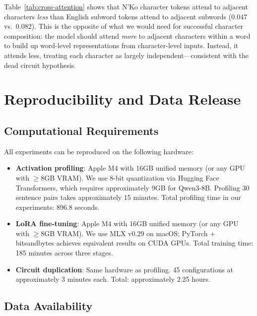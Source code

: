 \documentclass[11pt]{article}
\begin{document}
Table~\ref{tab:cross-attention} shows that N'Ko character tokens attend to adjacent characters \emph{less} than English subword tokens attend to adjacent subwords (0.047 vs.\ 0.082).
This is the opposite of what we would need for successful character composition: the model should attend \emph{more} to adjacent characters within a word to build up word-level representations from character-level inputs.
Instead, it attends less, treating each character as largely independent---consistent with the dead circuit hypothesis.

\section{Reproducibility and Data Release}

\subsection{Computational Requirements}

All experiments can be reproduced on the following hardware:
\begin{itemize}
\item \textbf{Activation profiling}: Apple M4 with 16GB unified memory (or any GPU with $\geq$8GB VRAM). We use 8-bit quantization via Hugging Face Transformers, which requires approximately 9GB for Qwen3-8B. Profiling 30 sentence pairs takes approximately 15 minutes. Total profiling time in our experiments: 896.8 seconds.
\item \textbf{LoRA fine-tuning}: Apple M4 with 16GB unified memory (or any GPU with $\geq$8GB VRAM). We use MLX v0.29 on macOS; PyTorch + bitsandbytes achieves equivalent results on CUDA GPUs. Total training time: 185 minutes across three stages.
\item \textbf{Circuit duplication}: Same hardware as profiling. 45 configurations at approximately 3 minutes each. Total: approximately 2.25 hours.
\end{itemize}

\subsection{Data Availability}
\end{document}

